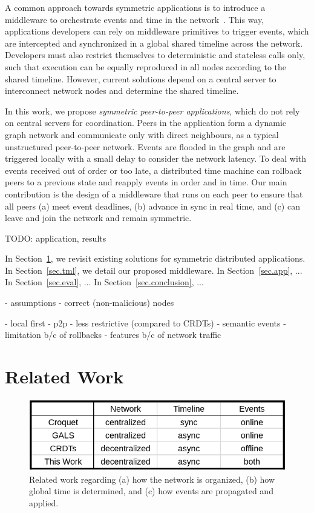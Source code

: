 \documentclass[10pt,journal,compsoc]{IEEEtran}
\begin{document}
A common approach towards symmetric applications is to introduce a middleware
to orchestrate events and time in the network~\cite{gals,croquet}.
This way, applications developers can rely on middleware primitives to trigger
events, which are intercepted and synchronized in a global shared timeline
across the network.
Developers must also restrict themselves to deterministic and stateless calls
only, such that execution can be equally reproduced in all nodes according to
the shared timeline.
However, current solutions depend on a central server to interconnect network
nodes and determine the shared timeline.

In this work, we propose \emph{symmetric peer-to-peer applications}, which
do not rely on central servers for coordination.
Peers in the application form a dynamic graph network and communicate only
with direct neighbours, as a typical unstructured peer-to-peer network.
Events are flooded in the graph and are triggered locally with a small delay
to consider the network latency.
To deal with events received out of order or too late, a distributed time
machine can rollback peers to a previous state and reapply events in order and
in time.
Our main contribution is the design of a middleware that runs on each peer to
ensure that all peers
    (a) meet event deadlines,
    (b) advance in sync in real time, and
    (c) can leave and join the network and remain symmetric.

TODO: application, results

In Section~\ref{sec.related}, we revisit existing solutions for symmetric
distributed applications.
In Section~\ref{sec.tml}, we detail our proposed middleware.
In Section~\ref{sec.app}, ...
In Section~\ref{sec.eval}, ...
In Section~\ref{sec.conclusion}, ...

- assumptions
    - correct (non-malicious) nodes

- local first
- p2p
- less restrictive (compared to CRDTs)
- semantic events
    - limitation b/c of rollbacks
    - features b/c of network traffic

\section{Related Work}
\label{sec.related}

\begin{figure}[t]
  \centering
  \includegraphics[width=\linewidth]{table}
  \caption{
    Related work regarding
        (a) how the network is organized,
        (b) how global time is determined, and
        (c) how events are propagated and applied.
    \label{fig.table}
  }
\end{figure}
\end{document}
